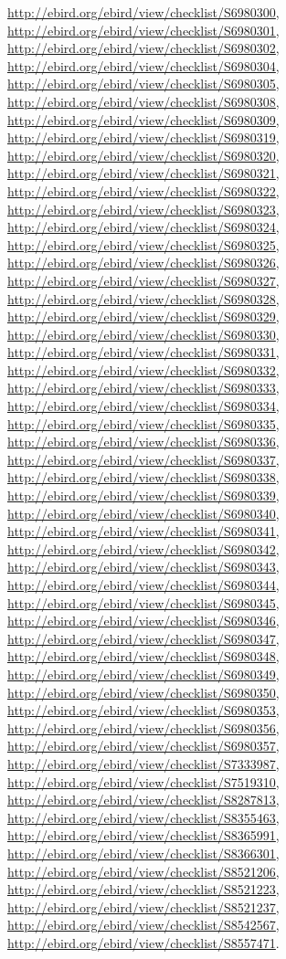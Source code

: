 \documentclass[9pt, article]{memoir}
\begin{document}
\begin{multicols}{2}
\url{http://ebird.org/ebird/view/checklist/S6980300}, 
\url{http://ebird.org/ebird/view/checklist/S6980301}, 
\url{http://ebird.org/ebird/view/checklist/S6980302}, 
\url{http://ebird.org/ebird/view/checklist/S6980304}, 
\url{http://ebird.org/ebird/view/checklist/S6980305}, 
\url{http://ebird.org/ebird/view/checklist/S6980308}, 
\url{http://ebird.org/ebird/view/checklist/S6980309}, 
\url{http://ebird.org/ebird/view/checklist/S6980319}, 
\url{http://ebird.org/ebird/view/checklist/S6980320}, 
\url{http://ebird.org/ebird/view/checklist/S6980321}, 
\url{http://ebird.org/ebird/view/checklist/S6980322}, 
\url{http://ebird.org/ebird/view/checklist/S6980323}, 
\url{http://ebird.org/ebird/view/checklist/S6980324}, 
\url{http://ebird.org/ebird/view/checklist/S6980325}, 
\url{http://ebird.org/ebird/view/checklist/S6980326}, 
\url{http://ebird.org/ebird/view/checklist/S6980327}, 
\url{http://ebird.org/ebird/view/checklist/S6980328}, 
\url{http://ebird.org/ebird/view/checklist/S6980329}, 
\url{http://ebird.org/ebird/view/checklist/S6980330}, 
\url{http://ebird.org/ebird/view/checklist/S6980331}, 
\url{http://ebird.org/ebird/view/checklist/S6980332}, 
\url{http://ebird.org/ebird/view/checklist/S6980333}, 
\url{http://ebird.org/ebird/view/checklist/S6980334}, 
\url{http://ebird.org/ebird/view/checklist/S6980335}, 
\url{http://ebird.org/ebird/view/checklist/S6980336}, 
\url{http://ebird.org/ebird/view/checklist/S6980337}, 
\url{http://ebird.org/ebird/view/checklist/S6980338}, 
\url{http://ebird.org/ebird/view/checklist/S6980339}, 
\url{http://ebird.org/ebird/view/checklist/S6980340}, 
\url{http://ebird.org/ebird/view/checklist/S6980341}, 
\url{http://ebird.org/ebird/view/checklist/S6980342}, 
\url{http://ebird.org/ebird/view/checklist/S6980343}, 
\url{http://ebird.org/ebird/view/checklist/S6980344}, 
\url{http://ebird.org/ebird/view/checklist/S6980345}, 
\url{http://ebird.org/ebird/view/checklist/S6980346}, 
\url{http://ebird.org/ebird/view/checklist/S6980347}, 
\url{http://ebird.org/ebird/view/checklist/S6980348}, 
\url{http://ebird.org/ebird/view/checklist/S6980349}, 
\url{http://ebird.org/ebird/view/checklist/S6980350}, 
\url{http://ebird.org/ebird/view/checklist/S6980353}, 
\url{http://ebird.org/ebird/view/checklist/S6980356}, 
\url{http://ebird.org/ebird/view/checklist/S6980357}, 
\url{http://ebird.org/ebird/view/checklist/S7333987}, 
\url{http://ebird.org/ebird/view/checklist/S7519310}, 
\url{http://ebird.org/ebird/view/checklist/S8287813}, 
\url{http://ebird.org/ebird/view/checklist/S8355463}, 
\url{http://ebird.org/ebird/view/checklist/S8365991}, 
\url{http://ebird.org/ebird/view/checklist/S8366301}, 
\url{http://ebird.org/ebird/view/checklist/S8521206}, 
\url{http://ebird.org/ebird/view/checklist/S8521223}, 
\url{http://ebird.org/ebird/view/checklist/S8521237}, 
\url{http://ebird.org/ebird/view/checklist/S8542567}, 
\url{http://ebird.org/ebird/view/checklist/S8557471}.


\end{multicols}
\end{document}
